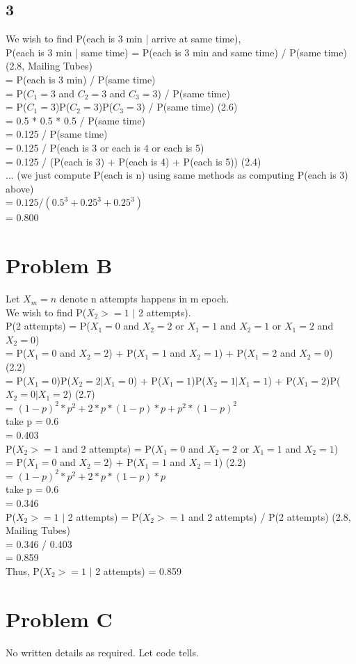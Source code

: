 \documentclass{article}
\begin{document}
\subsection{3}
We wish to find P(each is 3 min | arrive at same time),\\
P(each is 3 min | same time) = P(each is 3 min and same time) / P(same time) (2.8, Mailing Tubes)\\
= P(each is 3 min) / P(same time)\\
= P($C_{1}=3$ and $C_{2}=3$ and $C_{3}=3$) / P(same time)\\
= P($C_{1}=3$)P($C_{2}=3$)P($C_{3}=3$) / P(same time) (2.6)\\
= 0.5 * 0.5 * 0.5 / P(same time)\\
= 0.125 / P(same time)\\
= 0.125 / P(each is 3 or each is 4 or each is 5)\\
= 0.125 / (P(each is 3) + P(each is 4) + P(each is 5)) (2.4)\\
... (we just compute P(each is n) using same methods as computing P(each is 3) above)\\
= $0.125 / (0.5 ^ 3 + 0.25 ^ 3 + 0.25 ^ 3)$\\
= 0.800\\

\section{Problem B}
Let $X_{m}=n$ denote n attempts happens in m epoch.\\
We wish to find P($X_{2}>=1$ $|$ 2 attempts).\\

P(2 attempts) = P($X_{1}=0$ and $X_{2}=2$ or $X_{1}=1$ and $X_{2}=1$ or $X_{1}=2$ and $X_{2}=0$)\\
= P($X_{1}=0$ and $X_{2}=2$) + P($X_{1}=1$ and $X_{2}=1$) + P($X_{1}=2$ and $X_{2}=0$) (2.2)\\
= P($X_{1}=0$)P($X_{2}=2|X_{1}=0$) + P($X_{1}=1$)P($X_{2}=1|X_{1}=1$) + P($X_{1}=2$)P($X_{2}=0|X_{1}=2$) (2.7)\\
= $(1-p)^2*p^2 + 2*p*(1-p)*p + p^2*(1-p)^2$\\
take p = 0.6\\
= 0.403\\

P($X_{2}>=1$ and 2 attempts) = P($X_{1}=0$ and $X_{2}=2$ or $X_{1}=1$ and $X_{2}=1$)\\
= P($X_{1}=0$ and $X_{2}=2$) + P($X_{1}=1$ and $X_{2}=1$) (2.2)\\
= $(1-p)^2*p^2+2*p*(1-p)*p$\\
take p = 0.6\\
= 0.346\\

P($X_{2}>=1$ $|$ 2 attempts) = P($X_{2}>=1$ and 2 attempts) / P(2 attempts) (2.8, Mailing Tubes)\\
= 0.346 / 0.403\\
= 0.859\\

Thus, P($X_{2}>=1$ $|$ 2 attempts) = 0.859\\

\section{Problem C}
No written details as required. Let code tells.
\end{document}
